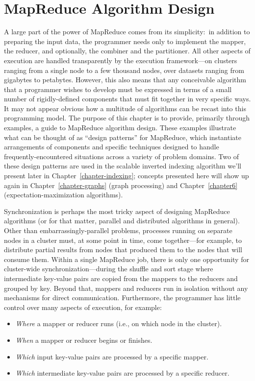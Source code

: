 \chapter{MapReduce Algorithm Design}
\label{chapter3}

A large part of the power of MapReduce comes from its simplicity:\ in
addition to preparing the input data, the programmer needs only to
implement the mapper, the reducer, and optionally, the combiner and
the partitioner.  All other aspects of execution are handled
transparently by the execution framework---on clusters ranging from a
single node to a few thousand nodes, over datasets ranging from
gigabytes to petabytes.  However, this also means that any conceivable
algorithm that a programmer wishes to develop must be expressed in
terms of a small number of rigidly-defined components that must fit
together in very specific ways.  It may not appear obvious how a
multitude of algorithms can be recast into this programming model.
The purpose of this chapter is to provide, primarily through examples,
a guide to MapReduce algorithm design.  These examples illustrate what
can be thought of as ``design patterns'' for MapReduce, which
instantiate arrangements of components and specific techniques
designed to handle frequently-encountered situations across a variety
of problem domains.  Two of these design patterns are used in the
scalable inverted indexing algorithm we'll present later in
Chapter~\ref{chapter-indexing}; concepts presented here will show up
again in Chapter~\ref{chapter-graphs} (graph processing) and
Chapter~\ref{chapter6} (expectation-maximization algorithms).

Synchronization is perhaps the most tricky aspect of designing
MapReduce algorithms (or for that matter, parallel and distributed
algorithms in general).  Other than embarrassingly-parallel problems,
processes running on separate nodes in a cluster must, at some point
in time, come together---for example, to distribute partial results
from nodes that produced them to the nodes that will consume them.
Within a single MapReduce job, there is only one opportunity for
cluster-wide synchronization---during the shuffle and sort stage where
intermediate key-value pairs are copied from the mappers to the
reducers and grouped by key.  Beyond that, mappers and reducers run in
isolation without any mechanisms for direct communication.
Furthermore, the programmer has little control over many aspects of
execution, for example:

\begin{itemize}

\item \emph{Where} a mapper or reducer runs (i.e., on which node in the
  cluster).

\item \emph{When} a mapper or reducer begins or finishes.

\item \emph{Which} input key-value pairs are processed by a specific
  mapper.

\item \emph{Which} intermediate key-value pairs are processed by a
  specific reducer.

\end{itemize}

